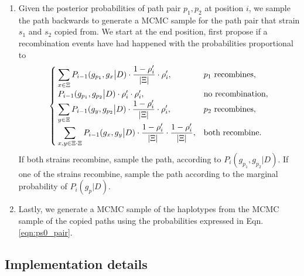 \documentclass{bioinfo}
\begin{document}
\begin{enumerate}
\item
Given the posterior probabilities of path pair $p_1,p_2$ at position $i$, we sample the path backwards to generate a MCMC sample for the path pair that strain $s_1$ and $s_2$ copied from. We start at the end position, first propose if a recombination events have had happened with the probabilities proportional to
$$\begin{cases}
\displaystyle\sum_{x\in \Xi}P_{i-1}(g_{p_1},g_{x}\big{|}D) \cdot \frac{1-\rho_i'}{|\Xi|}\cdot \rho_i', & p_1 \text{ recombines} \label{eqn:prob.update.two.v}, \\
P_{i-1}(g_{p_1},g_{p_2}\big{|}D) \cdot \rho_i' \cdot \rho_i', & \text{no recombination},\\
\displaystyle\sum_{y\in \Xi}P_{i-1}(g_{y},g_{p_2}\big{|}D) \cdot \frac{1-\rho_i'}{|\Xi|} \cdot \rho_i', & p_2 \text{ recombines} \label{eqn:prob.update.two.u}, \\
\displaystyle\sum_{x,y\in \Xi \cdot \Xi} P_{i-1}(g_{x},g_{y}\big{|}D) \cdot\frac{1-\rho_i'}{|\Xi|} \cdot \frac{1-\rho_i'}{|\Xi|} , & \text{both recombine}.
\end{cases}$$
If both strains recombine, sample the path, according to $P_i(g_{p_1}, g_{p_2}|D)$. If one of the strains recombine, sample the path according to the marginal probability of $P_i(g_{p}|D)$.

\item Lastly, we generate a MCMC sample of the haplotypes from the MCMC sample of the copied paths using the probabilities expressed in Eqn.\eqref{eqn:ps0_pair}.

\end{enumerate}


\subsection{Implementation details}
\end{document}
